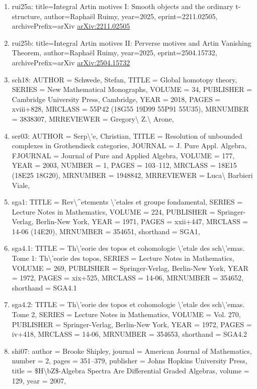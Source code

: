 \documentclass[11pt]{article}
\begin{document}
\begin{enumerate}[leftmargin=*]
  \item rui25a: title=Integral Artin motives I: Smooth objects and the ordinary t-structure, author=Raphaël Ruimy, year=2025, eprint=2211.02505, archivePrefix=arXiv \href{https://arxiv.org/abs/2211.02505}{arXiv:2211.02505}
  \item rui25b: title=Integral Artin motives II: Perverse motives and Artin Vanishing Theorem, author=Raphaël Ruimy, year=2025, eprint=2504.15732, archivePrefix=arXiv \href{https://arxiv.org/abs/2504.15732}{arXiv:2504.15732}
  \item sch18: AUTHOR = Schwede, Stefan, TITLE = Global homotopy theory, SERIES = New Mathematical Monographs, VOLUME = 34, PUBLISHER = Cambridge University Press, Cambridge, YEAR = 2018, PAGES = xviii+828, MRCLASS = 55P42 (18G55 19D99 55P91 55U35), MRNUMBER = 3838307, MRREVIEWER = Gregory\textbackslash{} Z.\textbackslash{} Arone,
  \item ser03: AUTHOR = Serp\textbackslash{}'e, Christian, TITLE = Resolution of unbounded complexes in Grothendieck categories, JOURNAL = J. Pure Appl. Algebra, FJOURNAL = Journal of Pure and Applied Algebra, VOLUME = 177, YEAR = 2003, NUMBER = 1, PAGES = 103--112, MRCLASS = 18E15 (18E25 18G20), MRNUMBER = 1948842, MRREVIEWER = Luca\textbackslash{} Barbieri Viale,
  \item sga1: TITLE = Rev\textbackslash{}\^{}etements \textbackslash{}'etales et groupe fondamental, SERIES = Lecture Notes in Mathematics, VOLUME = 224, PUBLISHER = Springer-Verlag, Berlin-New York, YEAR = 1971, PAGES = xxii+447, MRCLASS = 14-06 (14E20), MRNUMBER = 354651, shorthand = SGA1,
  \item sga4.1: TITLE = Th\textbackslash{}'eorie des topos et cohomologie \textbackslash{}'etale des sch\textbackslash{}'emas. Tome 1: Th\textbackslash{}'eorie des topos, SERIES = Lecture Notes in Mathematics, VOLUME = 269, PUBLISHER = Springer-Verlag, Berlin-New York, YEAR = 1972, PAGES = xix+525, MRCLASS = 14-06, MRNUMBER = 354652, shorthand = SGA4.1
  \item sga4.2: TITLE = Th\textbackslash{}'eorie des topos et cohomologie \textbackslash{}'etale des sch\textbackslash{}'emas. Tome 2, SERIES = Lecture Notes in Mathematics, VOLUME = Vol. 270, PUBLISHER = Springer-Verlag, Berlin-New York, YEAR = 1972, PAGES = iv+418, MRCLASS = 14-06, MRNUMBER = 354653, shorthand = SGA4.2
  \item shi07: author = Brooke Shipley, journal = American Journal of Mathematics, number = 2, pages = 351--379, publisher = Johns Hopkins University Press, title = \$H\textbackslash{}bZ\$-Algebra Spectra Are Differential Graded Algebras, volume = 129, year = 2007,

\end{enumerate}
\end{document}
